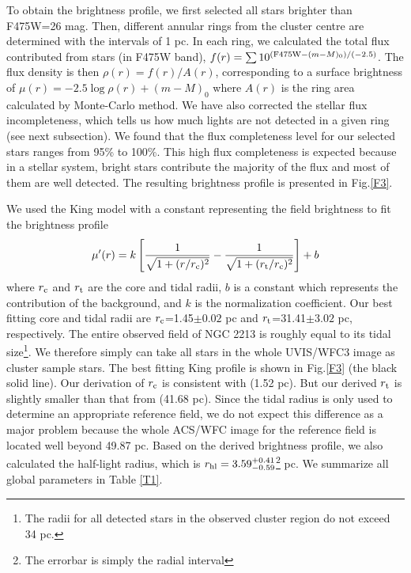 \documentclass[useAMS,usenatbib,twocolumn]{mnras}
\begin{document}
To obtain the brightness profile, we first selected all stars brighter than F475W=26 mag. 
Then, different annular rings from the cluster centre are determined with the intervals of 1 pc. In each ring, we calculated the total flux contributed from stars (in F475W band),  $f(r)=\sum{10^{({\rm F475W}-(m-M)_0)/(-2.5)}}$. The flux density is then $\rho(r)=f(r)/A(r)$, corresponding to a surface brightness of $\mu(r)=-2.5\log{\rho(r)}+(m-M)_0$ where $A(r)$ is the ring area calculated by Monte-Carlo method. We have also corrected the stellar flux incompleteness, which tells us how much lights are not detected in a given ring (see next subsection). We found that the flux completeness level for our selected stars ranges from 95\% to 100\%. This high flux completeness is expected because in a stellar system, bright stars contribute the majority of the flux and most of them are well detected. The resulting brightness profile is presented in Fig.\ref{F3}.

We used the King model with a constant representing the field brightness to fit the brightness profile \citep{King62a}
\begin{equation}
\mu'(r)=k\left[\frac{1}{\sqrt{1+(r/r_{\rm c})^2}}-\frac{1}{\sqrt{1+(r_{\rm t}/r_{\rm c})^2}}\right]+{b}
\end{equation}\label{E3}
where $r_{\rm c}$ and $r_{\rm t}$ are the core and tidal radii, $b$ is a constant which represents the contribution of the background, and $k$ is the normalization coefficient. Our best fitting core and tidal radii are $r_{\rm c}$=1.45$\pm0.02$ pc and $r_{\rm t}$=31.41$\pm3.02$ pc, respectively. The entire observed field of NGC 2213 is roughly equal to its tidal size\footnote{The radii for all detected stars in the observed cluster region do not exceed 34 pc.}. We therefore simply can take all stars in the whole UVIS/WFC3 image as cluster sample stars. The best fitting King profile is shown in Fig.\ref{F3} (the black solid line). Our derivation of $r_{\rm c}$ is consistent with \cite{Mcla05a} (1.52 pc). But our derived $r_{\rm t}$ is slightly smaller than that from \cite{Mcla05a} (41.68 pc). Since the tidal radius is only used to determine an appropriate reference field, we do not expect this difference as a major problem because the whole ACS/WFC image for the reference field is located well beyond 49.87 pc. Based on the derived brightness profile, we also calculated the half-light radius, which is $r_{\rm hl}=3.59^{+0.41}_{-0.59}$\footnote{The errorbar is simply the radial interval} pc. 
We summarize all global parameters in Table \ref{T1}.
\end{document}
